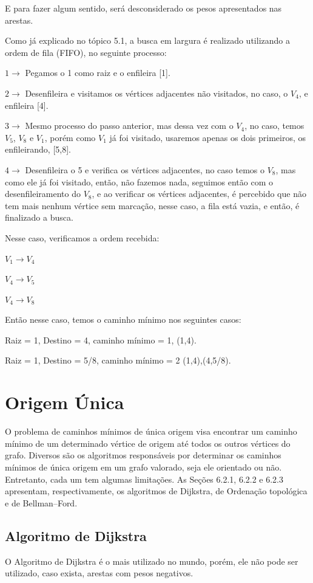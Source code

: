 E para fazer algum sentido, será desconsiderado os pesos apresentados nas arestas.

Como já explicado no tópico 5.1, a busca em largura é realizado utilizando a ordem de fila (FIFO), no seguinte processo:

$1 \rightarrow$ Pegamos o 1 como raiz e o enfileira [1].

$2 \rightarrow$ Desenfileira e visitamos os vértices adjacentes não visitados, no caso, o $V_4$, e enfileira [4].

$3 \rightarrow$ Mesmo processo do passo anterior, mas dessa vez com o $V_4$, no caso, temos $V_5$, $V_8$ e $V_1$, porém como $V_1$ já foi visitado, usaremos apenas os dois primeiros, os enfileirando, [5,8].

$4 \rightarrow$ Desenfileira o 5 e verifica os vértices adjacentes, no caso temos o $V_8$, mas como ele já foi visitado, então, não fazemos nada, seguimos então com o desenfileiramento do $V_8$, e ao verificar os vértices adjacentes, é percebido que não tem mais nenhum vértice sem marcação, nesse caso, a fila está vazia, e então, é finalizado a busca.

Nesse caso, verificamos a ordem recebida:

$V_1 \rightarrow V_4$

$V_4 \rightarrow V_5$

$V_4 \rightarrow V_8$

Então nesse caso, temos o caminho mínimo nos seguintes casos:

Raiz = 1, Destino = 4, caminho mínimo = 1, (1,4).

Raiz = 1, Destino = 5/8, caminho mínimo = 2 (1,4),(4,5/8).

\section{Origem Única}\label{sec:oUnica}

O problema de caminhos mínimos de única origem visa encontrar um caminho mínimo
de um determinado vértice de origem até todos os outros vértices do grafo. Diversos são os
algoritmos responsáveis por determinar os caminhos mínimos de única origem em um grafo valorado, seja ele orientado ou não. Entretanto, cada um tem algumas limitações. As Seções 6.2.1,
6.2.2 e 6.2.3 apresentam, respectivamente, os algoritmos de Dijkstra, de Ordenação topológica
e de Bellman–Ford.

\subsection{Algoritmo de Dijkstra}\label{sec:dijkstra}
O Algoritmo de Dijkstra é o mais utilizado no mundo, porém, ele não pode ser utilizado, caso exista, arestas com pesos negativos.

